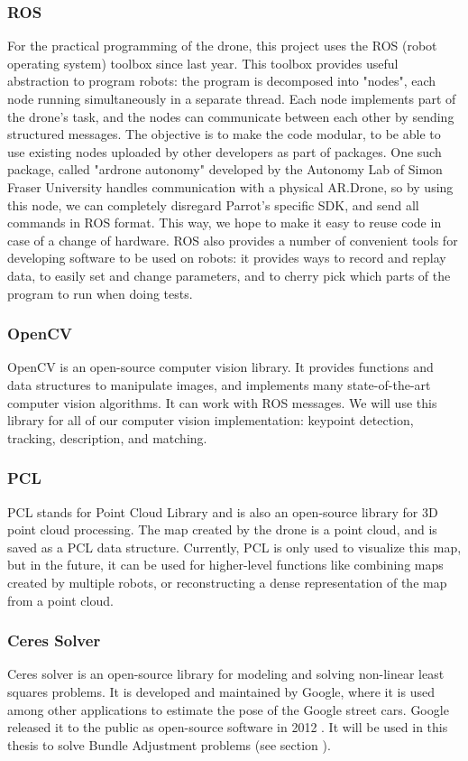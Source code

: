 \subsubsection{ROS}
\label{sssec:ROS}
For the practical programming of the drone, this project uses the ROS (robot operating system) toolbox since last year. This toolbox provides useful abstraction to program robots: the program is decomposed into "nodes", each node running simultaneously in a separate thread. Each node implements part of the drone's task, and the nodes can communicate between each other by sending structured messages. The objective is to make the code modular, to be able to use existing nodes uploaded by other developers as part of packages. One such package, called "ardrone autonomy" developed by the Autonomy Lab of Simon Fraser University handles communication with a physical AR.Drone, so by using this node, we can completely disregard Parrot's specific SDK, and send all commands in ROS format. This way, we hope to make it easy to reuse code in case of a change of hardware. ROS also provides a number of convenient tools for developing software to be used on robots: it provides ways to record and replay data, to easily set and change parameters, and to cherry pick which parts of the program to run when doing tests.

\subsubsection{OpenCV}
OpenCV is an open-source computer vision library. It provides functions and data structures to manipulate images, and implements many state-of-the-art computer vision algorithms. It can work with ROS messages. We will use this library for all of our computer vision implementation: keypoint detection, tracking, description, and matching.

\subsubsection{PCL}
PCL stands for Point Cloud Library and is also an open-source library for 3D point cloud processing. The map created by the drone is a point cloud, and is saved as a PCL data structure. Currently, PCL is only used to visualize this map, but in the future, it can be used for higher-level functions like combining maps created by multiple robots, or reconstructing a dense representation of the map from a point cloud.

\subsubsection{Ceres Solver}
Ceres solver \cite{ceres-solver} is an open-source library for modeling and solving non-linear least squares problems. It is developed and maintained by Google, where it is used among other applications to estimate the pose of the Google street cars. Google released it to the public as open-source software in 2012 \cite{introducingceres}. It will be used in this thesis to solve Bundle Adjustment problems (see section ).%


